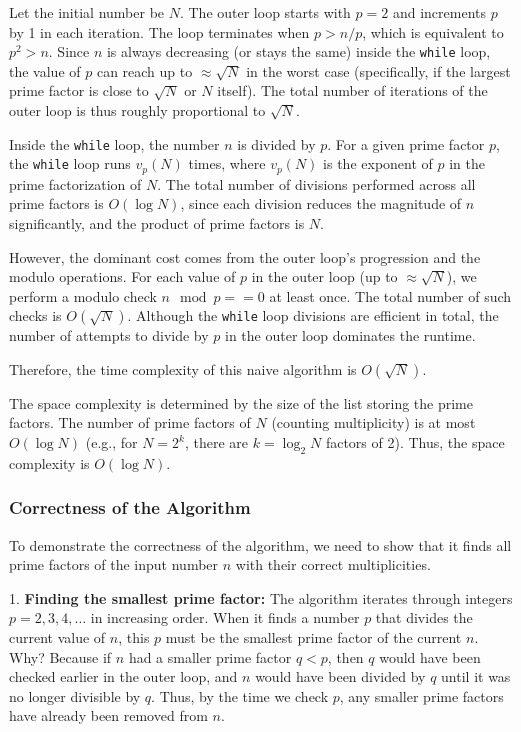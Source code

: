 \documentclass[oneside]{book}
\begin{document}
Let the initial number be $N$. The outer loop starts with $p=2$ and increments $p$ by 1 in each iteration. The loop terminates when $p > n/p$, which is equivalent to $p^2 > n$. Since $n$ is always decreasing (or stays the same) inside the \texttt{while} loop, the value of $p$ can reach up to $\approx \sqrt{N}$ in the worst case (specifically, if the largest prime factor is close to $\sqrt{N}$ or $N$ itself). The total number of iterations of the outer loop is thus roughly proportional to $\sqrt{N}$.

Inside the \texttt{while} loop, the number $n$ is divided by $p$. For a given prime factor $p$, the \texttt{while} loop runs $v_p(N)$ times, where $v_p(N)$ is the exponent of $p$ in the prime factorization of $N$. The total number of divisions performed across all prime factors is $O(\log N)$, since each division reduces the magnitude of $n$ significantly, and the product of prime factors is $N$.

However, the dominant cost comes from the outer loop's progression and the modulo operations. For each value of $p$ in the outer loop (up to $\approx \sqrt{N}$), we perform a modulo check $n \mod p == 0$ at least once. The total number of such checks is $O(\sqrt{N})$. Although the \texttt{while} loop divisions are efficient in total, the number of attempts to divide by $p$ in the outer loop dominates the runtime.

Therefore, the time complexity of this naive algorithm is $O(\sqrt{N})$.

The space complexity is determined by the size of the list storing the prime factors. The number of prime factors of $N$ (counting multiplicity) is at most $O(\log N)$ (e.g., for $N = 2^k$, there are $k = \log_2 N$ factors of 2). Thus, the space complexity is $O(\log N)$.

\subsubsection{Correctness of the Algorithm}
To demonstrate the correctness of the algorithm, we need to show that it finds all prime factors of the input number $n$ with their correct multiplicities.

1.  \textbf{Finding the smallest prime factor:} The algorithm iterates through integers $p = 2, 3, 4, \ldots$ in increasing order. When it finds a number $p$ that divides the current value of $n$, this $p$ must be the smallest prime factor of the current $n$. Why? Because if $n$ had a smaller prime factor $q < p$, then $q$ would have been checked earlier in the outer loop, and $n$ would have been divided by $q$ until it was no longer divisible by $q$. Thus, by the time we check $p$, any smaller prime factors have already been removed from $n$.
\end{document}
